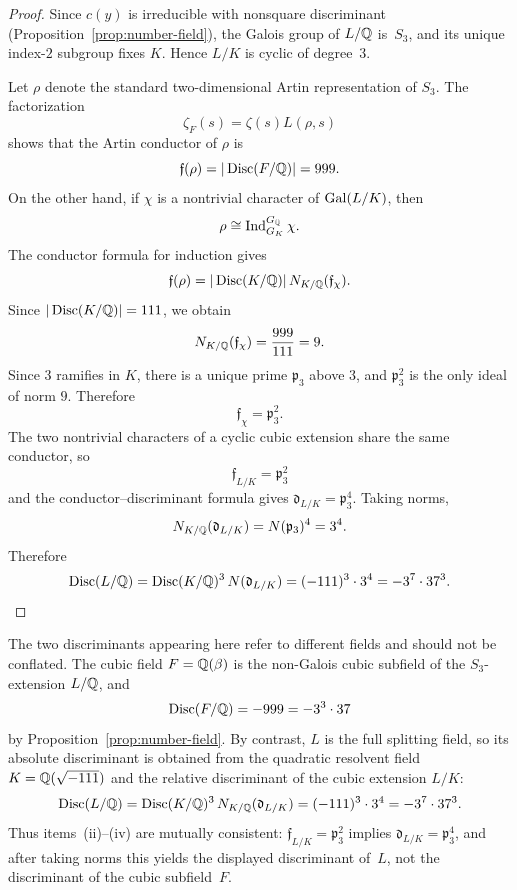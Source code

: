 \begin{proof}
Since \(c(y)\) is irreducible with nonsquare discriminant (Proposition~\ref{prop:number-field}), the Galois group of \(L/\mathbb{Q}\) is~\(S_3\), and its unique index-\(2\) subgroup fixes \(K\). Hence \(L/K\) is cyclic of degree~\(3\).

Let \(\rho\) denote the standard two-dimensional Artin representation of \(S_3\). The factorization
\[
\zeta_F(s)=\zeta(s)L(\rho,s)
\]
shows that the Artin conductor of \(\rho\) is
\[
\mathfrak f(\rho)=|\operatorname{Disc}(F/\mathbb{Q})|=999.
\]
On the other hand, if \(\chi\) is a nontrivial character of \(\operatorname{Gal}(L/K)\), then
\[
\rho\cong \operatorname{Ind}_{G_K}^{G_{\mathbb{Q}}}\chi.
\]
The conductor formula for induction gives \cite[Ch.~VII]{Neukirch1999}
\[
\mathfrak f(\rho)=|\operatorname{Disc}(K/\mathbb{Q})|\,N_{K/\mathbb{Q}}(\mathfrak f_\chi).
\]
Since \(|\operatorname{Disc}(K/\mathbb{Q})|=111\), we obtain
\[
N_{K/\mathbb{Q}}(\mathfrak f_\chi)=\frac{999}{111}=9.
\]
Since \(3\) ramifies in \(K\), there is a unique prime \(\mathfrak p_3\) above \(3\), and \(\mathfrak p_3^2\) is the only ideal of norm \(9\). Therefore
\[
\mathfrak f_\chi=\mathfrak p_3^2.
\]
The two nontrivial characters of a cyclic cubic extension share the same conductor, so
\[
\mathfrak f_{L/K}=\mathfrak p_3^2
\]
and the conductor--discriminant formula \cite[Ch.~VII]{Neukirch1999} gives \(\mathfrak d_{L/K}=\mathfrak p_3^4\). Taking norms,
\[
N_{K/\mathbb{Q}}(\mathfrak d_{L/K})=N(\mathfrak p_3)^4=3^4.
\]
Therefore
\[
\operatorname{Disc}(L/\mathbb{Q})=\operatorname{Disc}(K/\mathbb{Q})^3\,N(\mathfrak d_{L/K})
=(-111)^3\cdot 3^4
=-3^7\cdot 37^3.
\]
\end{proof}

\begin{remark}\label{rem:disc-distinction}
The two discriminants appearing here refer to different fields and should not be conflated. The cubic field \(F=\mathbb{Q}(\beta)\) is the non-Galois cubic subfield of the \(S_3\)-extension \(L/\mathbb{Q}\), and
\[
\operatorname{Disc}(F/\mathbb{Q})=-999=-3^3\cdot 37
\]
by Proposition~\ref{prop:number-field}. By contrast, \(L\) is the full splitting field, so its absolute discriminant is obtained from the quadratic resolvent field \(K=\mathbb{Q}(\sqrt{-111})\) and the relative discriminant of the cubic extension \(L/K\):
\[
\operatorname{Disc}(L/\mathbb{Q})=\operatorname{Disc}(K/\mathbb{Q})^3\,N_{K/\mathbb{Q}}(\mathfrak d_{L/K})
=(-111)^3\cdot 3^4
=-3^7\cdot 37^3.
\]
Thus items~(ii)--(iv) are mutually consistent: \(\mathfrak f_{L/K}=\mathfrak p_3^2\) implies \(\mathfrak d_{L/K}=\mathfrak p_3^4\), and after taking norms this yields the displayed discriminant of~\(L\), not the discriminant of the cubic subfield~\(F\).
\end{remark}

